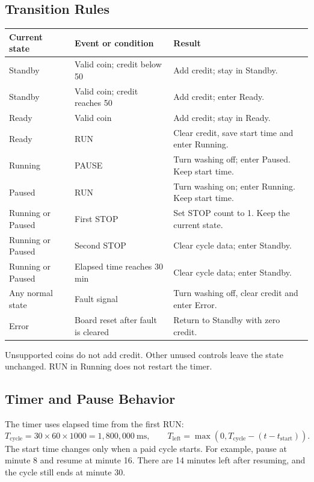 \subsection{Transition Rules}
{\small\renewcommand{\arraystretch}{1.09}
\begin{tabularx}{\linewidth}{@{}p{2.65cm}p{4.25cm}Y@{}}
\toprule
Current state & Event or condition & Result\\
\midrule
Standby & Valid coin; credit below 50 & Add credit; stay in Standby.\\
Standby & Valid coin; credit reaches 50 & Add credit; enter Ready.\\
Ready & Valid coin & Add credit; stay in Ready.\\
Ready & RUN & Clear credit, save start time and enter Running.\\
Running & PAUSE & Turn washing off; enter Paused. Keep start time.\\
Paused & RUN & Turn washing on; enter Running. Keep start time.\\
Running or Paused & First STOP & Set STOP count to 1. Keep the current state.\\
Running or Paused & Second STOP & Clear cycle data; enter Standby.\\
Running or Paused & Elapsed time reaches 30 min & Clear cycle data; enter Standby.\\
Any normal state & Fault signal & Turn washing off, clear credit and enter Error.\\
Error & Board reset after fault is cleared & Return to Standby with zero credit.\\
\bottomrule
\end{tabularx}}
Unsupported coins do not add credit. Other unused controls leave the state unchanged.
RUN in Running does not restart the timer.

\subsection{Timer and Pause Behavior}
The timer uses elapsed time from the first RUN:
\[
T_{\mathrm{cycle}}=30\times60\times1000=1{,}800{,}000\ \mathrm{ms},\qquad
T_{\mathrm{left}}=\max(0,T_{\mathrm{cycle}}-(t-t_{\mathrm{start}})).
\]
The start time changes only when a paid cycle starts. For example, pause at
minute 8 and resume at minute 16. There are 14 minutes left after resuming, and
the cycle still ends at minute 30.

